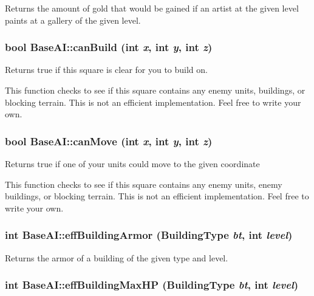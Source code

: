 Returns the amount of gold that would be gained if an artist at the given level paints at a gallery of the given level. \hypertarget{classBaseAI_05c91f733ed1598a95d4e7c357e0a0c4}{
\subsubsection[{canBuild}]{\setlength{\rightskip}{0pt plus 5cm}bool BaseAI::canBuild (int {\em x}, \/  int {\em y}, \/  int {\em z})}}
\label{classBaseAI_05c91f733ed1598a95d4e7c357e0a0c4}


Returns true if this square is clear for you to build on.

This function checks to see if this square contains any enemy units, buildings, or blocking terrain. This is not an efficient implementation. Feel free to write your own. \hypertarget{classBaseAI_45d4571f72aa781ba2db4cd46311ced3}{
\subsubsection[{canMove}]{\setlength{\rightskip}{0pt plus 5cm}bool BaseAI::canMove (int {\em x}, \/  int {\em y}, \/  int {\em z})}}
\label{classBaseAI_45d4571f72aa781ba2db4cd46311ced3}


Returns true if one of your units could move to the given coordinate

This function checks to see if this square contains any enemy units, enemy buildings, or blocking terrain. This is not an efficient implementation. Feel free to write your own. \hypertarget{classBaseAI_1de8bdc9274ca62632b9fb7caf55800e}{
\subsubsection[{effBuildingArmor}]{\setlength{\rightskip}{0pt plus 5cm}int BaseAI::effBuildingArmor ({\bf BuildingType} {\em bt}, \/  int {\em level})}}
\label{classBaseAI_1de8bdc9274ca62632b9fb7caf55800e}


Returns the armor of a building of the given type and level. \hypertarget{classBaseAI_80e0275443af5146969878b3802acbe7}{
\subsubsection[{effBuildingMaxHP}]{\setlength{\rightskip}{0pt plus 5cm}int BaseAI::effBuildingMaxHP ({\bf BuildingType} {\em bt}, \/  int {\em level})}}
\label{classBaseAI_80e0275443af5146969878b3802acbe7}


